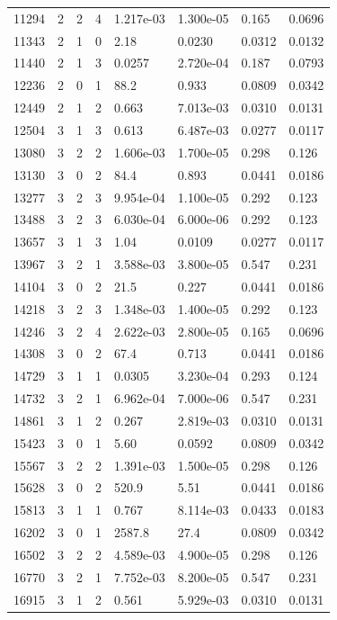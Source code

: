 \documentclass[preview]{standalone}
\begin{document}
{{{\begin{tabular}{L{1.2cm}C{1.2cm} C{0.3cm}C{0.5cm} C{1.4cm}C{1.4cm} C{1.4cm}C{1.4cm}}
  11294  &     2  & 2     &  4 &  1.217e-03  & 1.300e-05  & 0.165 &  0.0696   \\ 
  11343  &     2  & 1     &  0 &  2.18  & 0.0230  & 0.0312 &  0.0132   \\ 
  11440  &     2  & 1     &  3 &  0.0257  & 2.720e-04  & 0.187 &  0.0793   \\ 
  12236  &     2  & 0     &  1 &  88.2  & 0.933  & 0.0809 &  0.0342   \\ 
  12449  &     2  & 1     &  2 &  0.663  & 7.013e-03  & 0.0310 &  0.0131   \\ 
  12504  &     3  & 1     &  3 &  0.613  & 6.487e-03  & 0.0277 &  0.0117   \\ 
  13080  &     3  & 2     &  2 &  1.606e-03  & 1.700e-05  & 0.298 &  0.126   \\ 
  13130  &     3  & 0     &  2 &  84.4  & 0.893  & 0.0441 &  0.0186   \\ 
  13277  &     3  & 2     &  3 &  9.954e-04  & 1.100e-05  & 0.292 &  0.123   \\ 
  13488  &     3  & 2     &  3 &  6.030e-04  & 6.000e-06  & 0.292 &  0.123   \\ 
  13657  &     3  & 1     &  3 &  1.04  & 0.0109  & 0.0277 &  0.0117   \\ 
  13967  &     3  & 2     &  1 &  3.588e-03  & 3.800e-05  & 0.547 &  0.231   \\ 
  14104  &     3  & 0     &  2 &  21.5  & 0.227  & 0.0441 &  0.0186   \\ 
  14218  &     3  & 2     &  3 &  1.348e-03  & 1.400e-05  & 0.292 &  0.123   \\ 
  14246  &     3  & 2     &  4 &  2.622e-03  & 2.800e-05  & 0.165 &  0.0696   \\ 
  14308  &     3  & 0     &  2 &  67.4  & 0.713  & 0.0441 &  0.0186   \\ 
  14729  &     3  & 1     &  1 &  0.0305  & 3.230e-04  & 0.293 &  0.124   \\ 
  14732  &     3  & 2     &  1 &  6.962e-04  & 7.000e-06  & 0.547 &  0.231   \\ 
  14861  &     3  & 1     &  2 &  0.267  & 2.819e-03  & 0.0310 &  0.0131   \\ 
  15423  &     3  & 0     &  1 &  5.60  & 0.0592  & 0.0809 &  0.0342   \\ 
  15567  &     3  & 2     &  2 &  1.391e-03  & 1.500e-05  & 0.298 &  0.126   \\ 
  15628  &     3  & 0     &  2 &  520.9  & 5.51  & 0.0441 &  0.0186   \\ 
  15813  &     3  & 1     &  1 &  0.767  & 8.114e-03  & 0.0433 &  0.0183   \\ 
  16202  &     3  & 0     &  1 &  2587.8  & 27.4  & 0.0809 &  0.0342   \\ 
  16502  &     3  & 2     &  2 &  4.589e-03  & 4.900e-05  & 0.298 &  0.126   \\ 
  16770  &     3  & 2     &  1 &  7.752e-03  & 8.200e-05  & 0.547 &  0.231   \\ 
  16915  &     3  & 1     &  2 &  0.561  & 5.929e-03  & 0.0310 &  0.0131   \\ 
\hline 
\end{tabular} 

}}}
\end{document}
